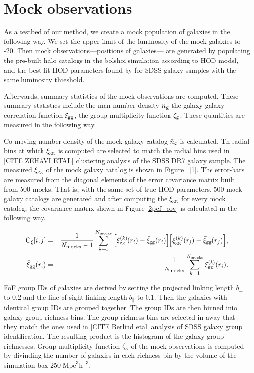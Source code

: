\documentclass[12pt, preprint]{aastex}
\begin{document}
\section{Mock observations}\label{sec:data}
As a testbed of our method, we create a mock population of galaxies in the following way. We set the upper limit of the luminosity of the mock galaxies to -20. Then mock observations---positions of galaxies--- are generated by populating the pre-built halo catalogs in the bolshoi simulation according to \cite{Zheng:2007aa} HOD model, and the best-fit HOD parameters found by \citet{Zheng:2007aa} for SDSS galaxy samples with the same luminosity threshold.

Afterwards, summary statistics of the mock observations are computed. These summary statistics include the man number density $\bar{n}_{\mathrm{g}}$ the galaxy-galaxy correlation function $\xi_{\mathrm{gg}}$, the group multiplicity function $\mathcal{\zeta}_{\rm g}$. These quantities are measured in the following way. 

Co-moving number density of the mock galaxy catalog $\bar{n}_{\mathrm{g}}$ is calculated. Th radial bins at which $\xi_{\mathrm{gg}}$ is computed are selected to match the radial bins used in [CITE ZEHAVI ETAL] clustering analysis of the SDSS DR7 galaxy sample. The measured $\xi_{\mathrm{gg}}$ of the mock galaxy catalog is shown in Figure ~\ref{1}. The error-bars are measured from the diagonal elements of the error covariance matrix built from 500 mocks. That is, with the same set of true HOD parameters, 500 mock galaxy catalogs are generated and after computing the $\xi_{\mathrm{gg}}$ for every mock catalog, the covariance matrix shown in Figure \ref{2pcf_cov} is calculated in the following way.

\begin{eqnarray} 
\mathrm{C}_{\xi}[i,j] &=& \frac{1}{N_{\mathrm{mocks}}-1}\sum_{k=1}^{N_{\mathrm{mocks}}} \Big[\xi_{\mathrm{gg}}^{(k)}(r_{i})-\bar{\xi}_{\rm gg}(r_{i})\Big]\Big[\xi_{\mathrm{gg}}^{(k)}(r_{j})-\bar{\xi}_{\rm gg}(r_{j}) \Big], \\
\bar{\xi}_{\rm gg}(r_{i}) &=& \frac{1}{N_{\mathrm{mocks}}}\sum_{k=1}^{N_{\mathrm{mocks}}} \xi_{\mathrm{gg}}^{(k)}(r_{i}).
\end{eqnarray}

FoF group IDs of galaxies are derived by setting the projected linking length $b_{\perp}$ to 0.2 and the line-of-sight linking length $b_{\parallel}$ to 0.1. Then the galaxies with identical group IDs are grouped together. The group IDs are then binned into galaxy group richness bins. The group richness bins are selected in away that they match the ones used in [CITE Berlind etal] analysis of SDSS galaxy group identification. The resulting product is the histogram of the galaxy group richnesses. Group multiplicity function $\mathcal{\zeta}_{\rm g}$ of the mock observations is computed by divinding the number of galaxies in each richness bin by the volume of the simulation box 250 $\mathrm{Mpc}^3\mathrm{h}^{-3}$.
\end{document}
